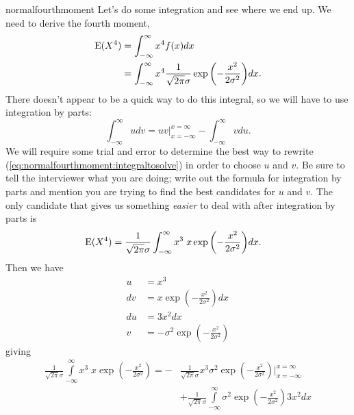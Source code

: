 \begin{answer}{normalfourthmoment}
Let's do some integration and see where we end up.
We need to derive the fourth moment,
\begin{align}
\operatorname{\mathrm{E}}(X^4)
&= \int_{-\infty}^{\infty}{
          x^4
          f(x)
          dx} \nonumber \\
&= \int_{-\infty}^{\infty}{
          x^4
          \frac{1}{\sqrt{2 \pi} \sigma }
          \exp{\left( -\frac{x^2}{2\sigma^2}  \right)}
          dx}
\label{eq:normalfourthmoment:integraltosolve}
\text{.}
\end{align}
There doesn't appear to be a quick way to do this integral, so we will have to use integration by parts:
\[
\int_{-\infty}^{\infty}{ u dv }
=
uv\Big\vert_{x=-\infty}^{x=\infty} - \int_{-\infty}^{\infty}{ v du }
\text{.}
\]
We will require some trial and error to determine the best way to rewrite
(\ref{eq:normalfourthmoment:integraltosolve}) in order to choose $u$ and $v$.
Be sure to tell the interviewer what you are doing; write out the formula for integration by parts and mention you are trying to find the best candidates for $u$ and $v$.
The only candidate that gives us something \emph{easier} to deal with after integration by parts is
\begin{align*}
\operatorname{\mathrm{E}}(X^4)
&=
          \frac{1}{\sqrt{2 \pi} \sigma }
          \int_{-\infty}^{\infty}{
          x^3
          \;
          x
          \exp{\left( -\frac{x^2}{2\sigma^2}  \right)}
          dx}
\text{.}
\end{align*}
Then we have
\begin{align*}
u   &= x^3      \\
dv  &=
        x
        \exp{\left( -\frac{x^2 }{2\sigma^2} \right)}
        dx
        \\
%
du  &= 3 x^2 dx \\
v   &=
       - \sigma^2
        \exp{\left( -\frac{x^2}{2\sigma^2}  \right)}
\end{align*}
giving
\begin{equation}
\begin{aligned}
\label{eq:fourthmoment:nearlythere}
\frac{1}{\sqrt{2 \pi} \sigma }
\int\limits_{-\infty}^{\infty}{
  x^3
  \;
  x \exp{\left( -\frac{x^2}{2\sigma^2}  \right)}
}
=
-&\frac{1}{\sqrt{2 \pi} \sigma }
x^3
\sigma^2
\exp{\left( -\frac{x^2}{2\sigma^2}  \right)} \bigg|_{x=-\infty}^{x=\infty}
\\
&+
\frac{1}{\sqrt{2 \pi} \sigma }
\int\limits_{-\infty}^{\infty}{
  \sigma^2
  \exp{\left( -\frac{x^2}{2\sigma^2}   \right)}
 3 x^2
  dx
}
\end{aligned}
\end{equation}
\end{answer}

